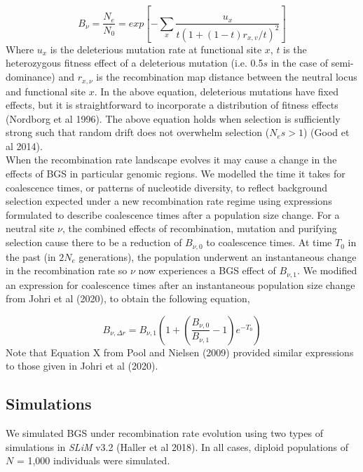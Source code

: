 \documentclass[10pt,twoside, twocolumn]{GSA_format}
\begin{document}
\begin{equation}
B_{\nu} = \frac{N_e}{N_0} = exp[ -\sum\limits_x \frac{u_x}{t(1+(1-t)r_{x,v}/t)^2} ]
\label{nordborg}
\end{equation}\noindent
Where $u_x$ is the deleterious mutation rate at functional site $x$, $t$ is the heterozygous fitness effect of a deleterious mutation (i.e. 0.5$s$ in the case of semi-dominance) and $r_{x,\nu}$ is the recombination map distance between the neutral locus and functional site $x$. In the above equation, deleterious mutations have fixed effects, but it is straightforward to incorporate a distribution of fitness effects (Nordborg et al 1996). The above equation holds when selection is sufficiently strong  such that random drift does not overwhelm selection ($N_es > 1$) (Good et al 2014). \\

When the recombination rate landscape evolves it may cause a change in the effects of BGS in particular genomic regions. We modelled the time it takes for coalescence times, or patterns of nucleotide diversity, to reflect background selection expected under a new recombination rate regime using expressions formulated to describe coalescence times after a population size change. For a neutral site $\nu$, the combined effects of recombination, mutation and purifying selection cause there to be a reduction of $B_{\nu,0}$ to coalescence times. At time $T_0$ in the past (in $2N_e$ generations), the population underwent an instantaneous change in the recombination rate so $\nu$ now experiences a BGS effect of $B_{\nu,1}$. We modified an expression for coalescence times after an instantaneous population size change from Johri et al (2020), to obtain the following equation,

\begin{equation}
B_{\nu,\Delta r} = B_{\nu,1} ( 1 + (\frac{B_{\nu,0}}{B_{\nu,1}} - 1)e^{-T_0})
\label{BGS_rec}
\end{equation}
\noindent
Note that Equation X from Pool and Nielsen (2009) provided similar expressions to those given in Johri et al (2020). 


\subsection{Simulations}

We simulated BGS under recombination rate evolution using two types of simulations in \textit{SLiM} v3.2 (Haller et al 2018). In all cases, diploid populations of $N$ = 1,000 individuals were simulated. \\
\end{document}
